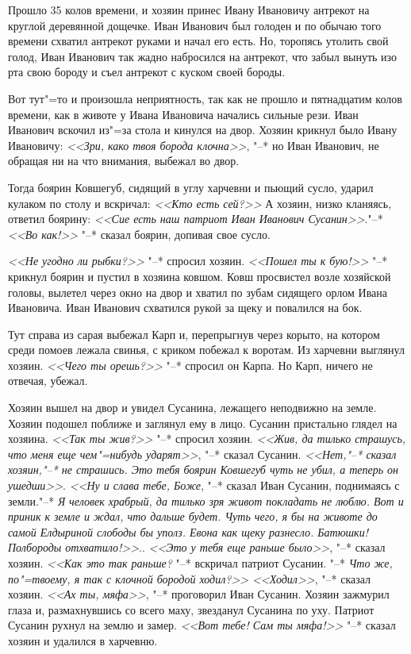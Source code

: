 \documentclass{article}
\begin{document}
Прошло 35 колов времени, и хозяин принес Ивану Ивановичу антрекот на круглой деревянной дощечке. Иван Иванович был голоден и по обычаю того времени схватил антрекот руками и начал его есть. Но, торопясь утолить свой голод, Иван Иванович так жадно набросился на антрекот, что забыл вынуть изо рта свою бороду и съел антрекот с куском своей бороды.

Вот тут"=то и произошла неприятность, так как не прошло и пятнадцатим колов времени, как в животе у Ивана Ивановича начались сильные рези. Иван Иванович вскочил из"=за стола и кинулся на двор. Хозяин крикнул было Ивану Ивановичу: \textit{<<Зри, како твоя борода клочна>>}, "--* но Иван Иванович, не обращая ни на что внимания, выбежал во двор.
    
Тогда боярин Ковшегуб,  сидящий  в  углу харчевни и пьющий сусло, ударил  кулаком  по столу и вскричал: \textit{<<Кто есть сей?>>}  А хозяин, низко кланяясь, ответил боярину: \textit{<<Сие есть наш патриот  Иван  Иванович  Сусанин>>}."--* \textit{<<Во как!>>} "--* сказал боярин, допивая свое сусло.
    
\textit{<<Не  угодно ли рыбки?>>} "--* спросил хозяин. \textit{<<Пошел ты к бую!>>} "--* крикнул боярин и  пустил в  хозяина ковшом. Ковш просвистел возле хозяйской головы, вылетел через окно на двор и хватил по зубам  сидящего орлом Ивана Ивановича. Иван Иванович  схватился рукой за щеку и повалился на бок.
    
Тут справа из сарая выбежал  Карп и, перепрыгнув через корыто, на котором среди помоев лежала свинья, с криком побежал к воротам. Из харчевни выглянул хозяин. \textit{<<Чего ты орешь?>>} "--* спросил он Карпа. Но Карп,  ничего не отвечая, убежал.
    
Хозяин вышел на двор и увидел  Сусанина, лежащего неподвижно на земле. Хозяин подошел поближе  и заглянул ему в лицо. Сусанин пристально глядел на хозяина.  \textit{<<Так ты жив?>>} "--* спросил  хозяин. \textit{<<Жив, да тилько страшусь, что  меня еще чем"=нибудь ударят>>}, "--*  сказал Сусанин. \textit{<<Нет,"--* сказал хозяин,"--*  не  страшись. Это тебя боярин Ковшегуб чуть не убил, а теперь он ушедши>>}. \textit{<<Ну и слава тебе, Боже}, "--* сказал Иван Сусанин, поднимаясь с земли."--* \textit{Я человек храбрый, да тилько  зря  живот покладать  не  люблю.  Вот и приник к земле  и ждал, что дальше будет. Чуть чего,  я бы  на животе до самой Елдыриной слободы бы  уполз. Евона как щеку разнесло. Батюшки!  Полбороды отхватило!>>}.. \textit{<<Это у тебя еще раньше было>>}, "--* сказал хозяин. \textit{<<Как это так раньше?} "--* вскричал патриот Сусанин. "--* \textit{Что же,  по"=твоему, я так с клочной бородой ходил?>>} \textit{<<Ходил>>}, "--* сказал хозяин. \textit{<<Ах ты, мяфа>>}, "--* проговорил Иван Сусанин. Хозяин зажмурил глаза и, размахнувшись  со  всего  маху, звезданул Сусанина по уху. Патриот Сусанин рухнул  на  землю и замер. \textit{<<Вот тебе! Сам ты мяфа!>>} "--* сказал хозяин и удалился в харчевню.
    
\end{document}
